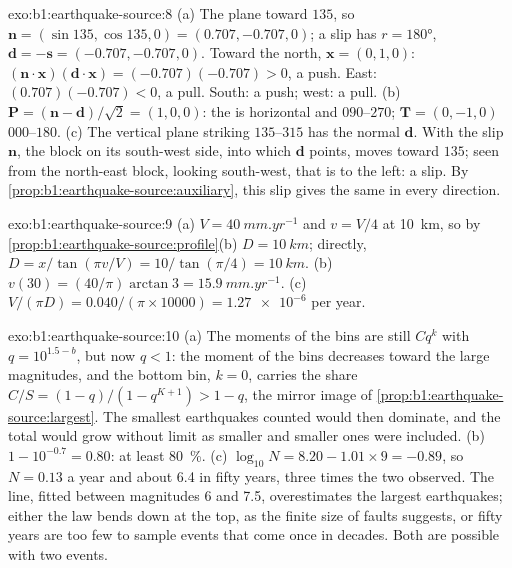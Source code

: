 \begin{solution}{exo:b1:earthquake-source:8}
(a) The plane  toward $135$, so $\mathbf n = (\sin135, \cos135, 0) =
(0.707, -0.707, 0)$; a  slip has $r = \ang{180}$, $\mathbf d = -\mathbf s
= (-0.707, -0.707, 0)$. Toward the north, $\mathbf x = (0, 1, 0)$:
$(\mathbf n\cdot\mathbf x)(\mathbf d\cdot\mathbf x) = (-0.707)(-0.707) > 0$, a
push. East: $(0.707)(-0.707) < 0$, a pull. South: a push; west: a pull.
(b) $\mathbf P = (\mathbf n - \mathbf d)/\sqrt2 = (1, 0, 0)$: the  is
horizontal and  $090$--$270$; $\mathbf T = (0, -1, 0)$ 
$000$--$180$. (c) The vertical plane striking $135$--$315$ has the normal
$\mathbf d$. With the slip $\mathbf n$, the block on its south-west side, into
which $\mathbf d$ points, moves toward $135$; seen from the north-east block,
looking south-west, that is to the left: a  slip. By
\cref{prop:b1:earthquake-source:auxiliary}, this slip gives the same  in every direction.
\end{solution}

\begin{solution}{exo:b1:earthquake-source:9}
(a) $V = \qty{40}{mm.yr^{-1}}$ and $v = V/4$ at \qty{10}{km}, so by
\cref{prop:b1:earthquake-source:profile}(b) $D = \qty{10}{km}$; directly,
$D = x/\tan(\pi v/V) = 10/\tan(\pi/4) = \qty{10}{km}$. (b) $v(30) =
(40/\pi)\arctan 3 = \qty{15.9}{mm.yr^{-1}}$. (c) $V/(\pi D) =
\num{0.040}/(\pi\times\num{10000}) = \num{1.27e-6}$ per year.
\end{solution}

\begin{solution}{exo:b1:earthquake-source:10}
(a) The moments of the bins are still $C q^k$ with $q = 10^{1.5 - b}$, but now
$q < 1$: the moment of the bins decreases toward the large magnitudes, and the
bottom bin, $k = 0$, carries the share $C/S = (1 - q)/(1 - q^{K+1}) > 1 - q$, the
mirror image of \cref{prop:b1:earthquake-source:largest}. The smallest
earthquakes counted would then dominate, and the total would grow without limit
as smaller and smaller ones were included. (b) $1 - 10^{-0.7} = 0.80$: at least
\qty{80}{\percent}. (c) $\log_{10}N = 8.20 - 1.01\times9 = -0.89$, so $N = 0.13$
a year and about 6.4 in fifty years, three times the two observed. The line,
fitted between magnitudes 6 and 7.5, overestimates the largest earthquakes;
either the law bends down at the top, as the finite size of faults suggests, or
fifty years are too few to sample events that come once in decades. Both are
possible with two events.
\end{solution}

